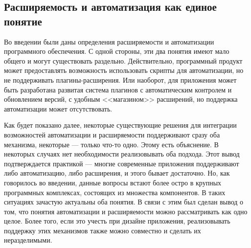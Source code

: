 \subsection{Расширяемость и автоматизация как единое понятие}
\label{sec:autom-and-ext-as-one-thing}

Во введении были даны определения расширяемости и автоматизации программного обеспечения. С одной стороны, эти два понятия имеют мало общего и могут существовать раздельно. Действительно, программный продукт может предоставлять возможность использовать скрипты для автоматизации, но не поддерживать плагины-расширения. Или наоборот, для приложения может быть разработана развитая система плагинов с автоматическим контролем и обновлением версий, с удобным <<магазином>> расширений, но поддержка автоматизации может отсутствовать.

Как будет показано далее, некоторые существующие решения для интеграции возможностей автоматизации и расширяемости поддерживают сразу оба механизма, некоторые --- только что-то одно. Этому есть объяснение. В некоторых случаях нет необходимости реализовывать оба подхода. Этот вывод подтверждается практикой --- многие современные приложения поддерживают либо автоматизацию, либо расширения, и этого бывает достаточно. Но, как говорилось во введении, данные вопросы встают более остро в крупных программных комплексах, состоящих из множества компонентов. В таких ситуациях зачастую актуальны оба понятия. В связи с этим был сделан вывод о том, что понятия автоматизации и расширяемости можно рассматривать как одно целое. Более того, если это учесть при дизайне приложения, реализовывать поддержку этих механизмов также можно совместно и сделать их неразделимыми.



